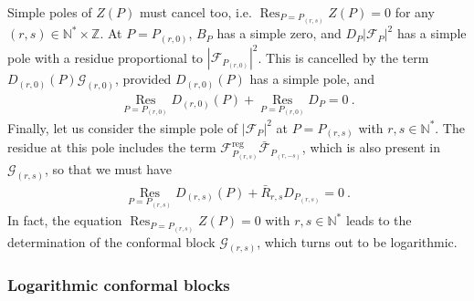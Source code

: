 \documentclass[12pt, a4paper]{article}
\theoremstyle{break}
\begin{document}
Simple poles of $Z(P)$ must cancel too, i.e. $\operatorname{Res}_{P=P_{(r,s)}}Z(P)=0$ for any $(r,s)\in \mathbb{N}^*\times\mathbb{Z}$. At $P=P_{(r,0)}$, $B_P$ has a simple zero, and $D_P\left|\mathcal{F}_P\right|^2$ has a simple pole with a residue proportional to $\left|\mathcal{F}_{P_{(r,0)}}\right|^2$. This is  cancelled by the term $D_{(r,0)}(P) \mathcal{G}_{(r,0)}$, provided $D_{(r,0)}(P)$ has a simple pole, and 
\begin{align}
  \underset{P=P_{(r,0)}}{\operatorname{Res}} D_{(r,0)}(P) + \underset{P=P_{(r,0)}}{\operatorname{Res}}D_P = 0 \ .
\end{align}
Finally, let us consider the simple pole of $\left|\mathcal{F}_{P}\right|^2$ at $P=P_{(r,s)}$ with $r,s\in \mathbb{N}^*$. The residue at this pole includes the term 
$\mathcal{F}_{P_{(r,s)}}^\text{reg}\bar{\mathcal{F}}_{P_{(r,-s)}}$, which is also present in $\mathcal{G}_{(r,s)}$, so that we must have 
\begin{align}
 \underset{P=P_{(r,s)}}{\operatorname{Res}} D_{(r,s)}(P) + \bar R_{r,s} D_{P_{(r,s)}} = 0\ .
 \label{rdp}
\end{align}
In fact, the equation $\operatorname{Res}_{P=P_{(r,s)}}Z(P)=0$ with $r,s\in \mathbb{N}^*$ leads to the determination of the conformal block $\mathcal{G}_{(r,s)}$, which turns out to be logarithmic. 

\subsubsection{Logarithmic conformal blocks}\label{sec:log}
\end{document}

